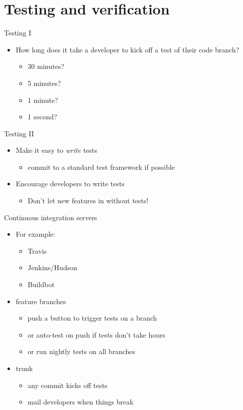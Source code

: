 \documentclass[presentation]{beamer}
\begin{document}
\section{Testing and verification}
\label{sec-3}

\begin{frame}[label=sec-3-1]{Testing I}
\begin{itemize}
\item How long does it take a developer to kick off a test of their code
branch?
\begin{itemize}
\item 30 minutes?
\item 5 minutes?
\item 1 minute?
\item 1 second?
\end{itemize}
\end{itemize}
\end{frame}
\begin{frame}[label=sec-3-2]{Testing II}
\begin{itemize}
\item Make it easy to \emph{write} tests
\begin{itemize}
\item commit to a standard test framework if possible
\end{itemize}
\item Encourage developers to write tests
\begin{itemize}
\item Don't let new features in without tests!
\end{itemize}
\end{itemize}
\end{frame}
\begin{frame}[label=sec-3-3]{Continuous integration servers}
\begin{itemize}
\item For example:
\begin{itemize}
\item Travis
\item Jenkins/Hudson
\item Buildbot
\end{itemize}
\item feature branches
\begin{itemize}
\item push a button to trigger tests on a branch
\item or auto-test on push if tests don't take hours
\item or run nightly tests on all branches
\end{itemize}
\item trunk
\begin{itemize}
\item any commit kicks off tests
\item mail developers when things break
\end{itemize}
\end{itemize}
\end{frame}
\end{document}
